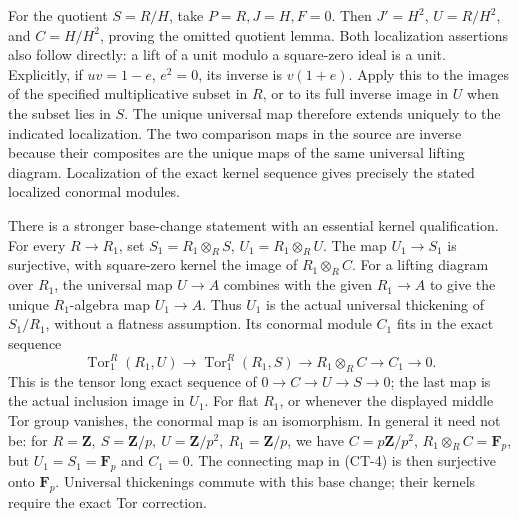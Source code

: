 For the quotient \(S=R/H\), take \(P=R,J=H,F=0\). Then \(J'=H^2\), \(U=R/H^2\), and \(C=H/H^2\), proving the omitted quotient lemma. Both localization assertions also follow directly: a lift of a unit modulo a square-zero ideal is a unit. Explicitly, if \(uv=1-e\), \(e^2=0\), its inverse is \(v(1+e)\). Apply this to the images of the specified multiplicative subset in \(R\), or to its full inverse image in \(U\) when the subset lies in \(S\). The unique universal map therefore extends uniquely to the indicated localization. The two comparison maps in the source are inverse because their composites are the unique maps of the same universal lifting diagram. Localization of the exact kernel sequence gives precisely the stated localized conormal modules.

There is a stronger base-change statement with an essential kernel qualification. For every \(R\to R_1\), set \(S_1=R_1\otimes_RS\), \(U_1=R_1\otimes_RU\). The map \(U_1\to S_1\) is surjective, with square-zero kernel the image of \(R_1\otimes_RC\). For a lifting diagram over \(R_1\), the universal map \(U\to A\) combines with the given \(R_1\to A\) to give the unique \(R_1\)-algebra map \(U_1\to A\). Thus \(U_1\) is the actual universal thickening of \(S_1/R_1\), without a flatness assumption. Its conormal module \(C_1\) fits in the exact sequence \[
\operatorname{Tor}_1^R(R_1,U)\longrightarrow
\operatorname{Tor}_1^R(R_1,S)\longrightarrow
R_1\otimes_RC\longrightarrow C_1\longrightarrow0.
\tag{CT-4}
\] This is the tensor long exact sequence of \(0\to C\to U\to S\to0\); the last map is the actual inclusion image in \(U_1\). For flat \(R_1\), or whenever the displayed middle Tor group vanishes, the conormal map is an isomorphism. In general it need not be: for \(R=\mathbf Z,\ S=\mathbf Z/p,\ U=\mathbf Z/p^2,\ R_1=\mathbf Z/p\), we have \(C=p\mathbf Z/p^2\), \(R_1\otimes_RC=\mathbf F_p\), but \(U_1=S_1=\mathbf F_p\) and \(C_1=0\). The connecting map in (CT-4) is then surjective onto \(\mathbf F_p\). Universal thickenings commute with this base change; their kernels require the exact Tor correction.

